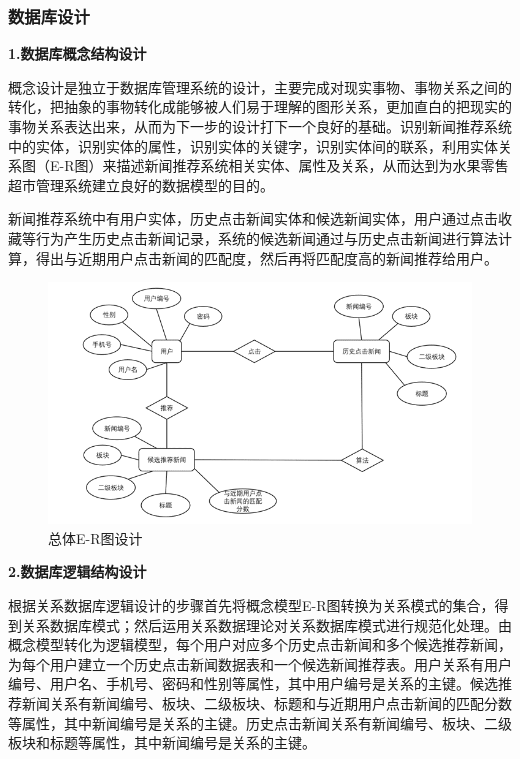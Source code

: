\documentclass[withoutpreface,bwprint]{cumcmthesis} %
\begin{document}
	\subsubsection{ 数据库设计}
	\textbf{1.数据库概念结构设计}\par
	概念设计是独立于数据库管理系统的设计，主要完成对现实事物、事物关系之间的转化，把抽象的事物转化成能够被人们易于理解的图形关系，更加直白的把现实的事物关系表达出来，从而为下一步的设计打下一个良好的基础。识别新闻推荐系统中的实体，识别实体的属性，识别实体的关键字，识别实体间的联系，利用实体关系图（E-R图）来描述新闻推荐系统相关实体、属性及关系，从而达到为水果零售超市管理系统建立良好的数据模型的目的。\par
	新闻推荐系统中有用户实体，历史点击新闻实体和候选新闻实体，用户通过点击收藏等行为产生历史点击新闻记录，系统的候选新闻通过与历史点击新闻进行算法计算，得出与近期用户点击新闻的匹配度，然后再将匹配度高的新闻推荐给用户。\par
	\begin{figure}[H]
		\centering
		\includegraphics[width=1.00\textwidth]{总体E-R图设计}
		\caption{总体E-R图设计}
		\label{fig:circuit-diagcam}
	\end{figure}	
	\textbf{2.数据库逻辑结构设计}\par
	根据关系数据库逻辑设计的步骤首先将概念模型E-R图转换为关系模式的集合，得到关系数据库模式；然后运用关系数据理论对关系数据库模式进行规范化处理。由概念模型转化为逻辑模型，每个用户对应多个历史点击新闻和多个候选推荐新闻，为每个用户建立一个历史点击新闻数据表和一个候选新闻推荐表。用户关系有用户编号、用户名、手机号、密码和性别等属性，其中用户编号是关系的主键。候选推荐新闻关系有新闻编号、板块、二级板块、标题和与近期用户点击新闻的匹配分数等属性，其中新闻编号是关系的主键。历史点击新闻关系有新闻编号、板块、二级板块和标题等属性，其中新闻编号是关系的主键。\par
\end{document}

